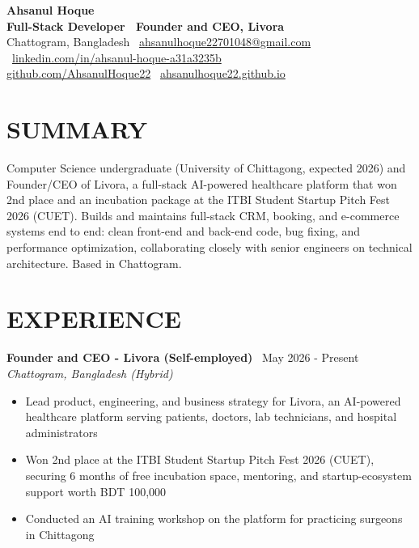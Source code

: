 \documentclass[10.5pt,a4paper]{article}
\newenvironment{tightitemize}{
  \begin{itemize}[leftmargin=15pt, itemsep=1pt, parsep=0pt, topsep=2pt]
}{
  \end{itemize}
}
\newcommand{\entry}[3]{%
  \textbf{#1} \textbar\ #2\\
  \textit{#3}%
}
\begin{document}
{\huge \bfseries Ahsanul Hoque}\\[2pt]
{\bfseries Full-Stack Developer \textbar\ Founder and CEO, Livora}\\[5pt]
{\small
  Chattogram, Bangladesh \textbar\
  \href{mailto:ahsanulhoque22701048@gmail.com}{ahsanulhoque22701048@gmail.com} \textbar\
  \href{https://linkedin.com/in/ahsanul-hoque-a31a3235b}{linkedin.com/in/ahsanul-hoque-a31a3235b} \textbar\\
  \href{https://github.com/AhsanulHoque22}{github.com/AhsanulHoque22} \textbar\
  \href{https://ahsanulhoque22.github.io}{ahsanulhoque22.github.io}
}

\section*{SUMMARY}
Computer Science undergraduate (University of Chittagong, expected 2026) and Founder/CEO of Livora, a full-stack AI-powered healthcare platform that won 2nd place and an incubation package at the ITBI Student Startup Pitch Fest 2026 (CUET). Builds and maintains full-stack CRM, booking, and e-commerce systems end to end: clean front-end and back-end code, bug fixing, and performance optimization, collaborating closely with senior engineers on technical architecture. Based in Chattogram.

\section*{EXPERIENCE}

\entry{Founder and CEO - Livora (Self-employed)}{May 2026 - Present}{Chattogram, Bangladesh (Hybrid)}
\begin{tightitemize}
  \item Lead product, engineering, and business strategy for Livora, an AI-powered healthcare platform serving patients, doctors, lab technicians, and hospital administrators
  \item Won 2nd place at the ITBI Student Startup Pitch Fest 2026 (CUET), securing 6 months of free incubation space, mentoring, and startup-ecosystem support worth BDT 100,000
  \item Conducted an AI training workshop on the platform for practicing surgeons in Chittagong
\end{tightitemize}

\end{document}
